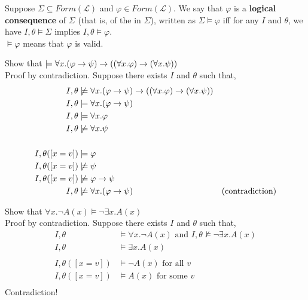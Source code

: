 \documentclass[english, 11pt]{article}
\begin{document}
\begin{defn}\label{logical consequence}
Suppose $\Sigma \subseteq Form(\mathcal{L})$ and $\varphi \in Form(\mathcal{L})$. We say that $\varphi$ is a \textbf{logical consequence} of $\Sigma$ (that is, of the  in $\Sigma$), written as $\Sigma \models \varphi$ iff for any  $I$ and  $\theta$, we have $I, \theta \models \Sigma$ implies $I , \theta \models \varphi$. \\

$\models \varphi$ means that $\varphi$ is valid.
\end{defn}
\begin{exmp}
  Show that $\models \forall x. (\varphi \rightarrow \psi) \rightarrow ((\forall x. \varphi) \rightarrow (\forall x . \psi))$ \\

  Proof by contradiction. Suppose there exists $I$ and $\theta$ such that,
  \begin{align*}
    I,\theta & \not \models \forall x.(\varphi \rightarrow \psi) \rightarrow ((\forall x . \varphi) \rightarrow (\forall x .\psi)) \\
    I,\theta & \models \forall x.(\varphi \rightarrow \psi) \\
    I,\theta & \models \forall x.\varphi \\
    I,\theta & \not  \models \forall x.\psi \\
    & \\
    I,\theta([x = v]) &\models \varphi \\
    I, \theta ([x = v])& \not \models \psi \\
    I, \theta ([x = v]) &\not \models \varphi \rightarrow \psi \\
    I,\theta &\not \models \forall x.(\varphi \rightarrow \psi) & \mbox{(contradiction)}
  \end{align*}
\end{exmp}
\begin{exmp}
  Show that $\forall x . \neg A(x) \models \neg \exists x . A(x)$ \\

  Proof by contradiction. Suppose there exists $I$ and $\theta$ such that,
  \begin{align*}
    I,\theta &\models \forall x . \neg A(x) \mbox{ \ \ and \ \ } I,\theta \not \models \neg \exists x . A(x) \\
    I, \theta &\models \exists x.A(x) \\
    & \\
    I,\theta([x = v]) &\models \neg A(x) \mbox{ \ \ for all $v$} \\
    I,\theta([x = v]) &\models A(x) \mbox{ \ \ for some $v$} \\
  \end{align*}
  Contradiction!
\end{exmp}
\end{document}
